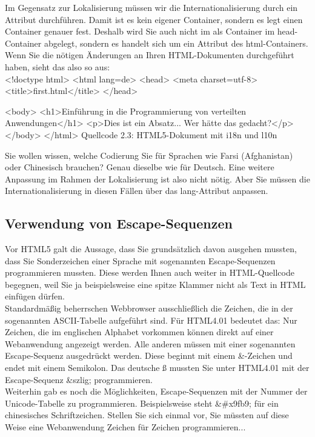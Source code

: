 Im Gegensatz zur Lokalisierung müssen wir die Internationalisierung durch ein Attribut durchführen. Damit ist es kein eigener Container, sondern es legt einen Container genauer fest. Deshalb wird Sie auch nicht im als Container im head-Container abgelegt, sondern es handelt sich um ein Attribut des html-Containers.\\

Wenn Sie die nötigen Änderungen an Ihren HTML-Dokumenten durchgeführt haben, sieht das also so aus:\\

<!doctype html> 
<html lang=de> 
<head> 
<meta charset=utf-8>
<title>first.html</title> 
</head> 

<body> 
<h1>Einführung in die Programmierung von verteilten Anwendungen</h1>
<p>Dies ist ein Absatz... Wer hätte das gedacht?</p> 
</body> 
</html>
Quellcode 2.3: HTML5-Dokument mit i18n und l10n

Sie wollen wissen, welche Codierung Sie für Sprachen wie Farsi (Afghanistan) oder Chinesisch brauchen? Genau dieselbe wie für Deutsch. Eine weitere Anpassung im Rahmen der Lokalisierung ist also nicht nötig. Aber Sie müssen die Internationalisierung in diesen Fällen über das lang-Attribut anpassen.

\subsection{Verwendung von Escape-Sequenzen}

Vor HTML5 galt die Aussage, dass Sie grundsätzlich davon ausgehen mussten, dass Sie Sonderzeichen einer Sprache mit sogenannten Escape-Sequenzen programmieren mussten. Diese werden Ihnen auch weiter in HTML-Quellcode begegnen, weil Sie ja beispielsweise eine spitze Klammer nicht als Text in HTML einfügen dürfen.\\

Standardmäßig beherrschen Webbrowser ausschließlich die Zeichen, die in der sogenannten ASCII-Tabelle aufgeführt sind. Für HTML4.01 bedeutet das: Nur Zeichen, die im englischen Alphabet vorkommen können direkt auf einer Webanwendung angezeigt werden. Alle anderen müssen mit einer sogenannten Escape-Sequenz ausgedrückt werden. Diese beginnt mit einem \&-Zeichen und endet mit einem Semikolon. Das deutsche ß mussten Sie unter HTML4.01 mit der Escape-Sequenz \&szlig; programmieren.\\

Weiterhin gab es noch die Möglichkeiten, Escape-Sequenzen mit der Nummer der Unicode-Tabelle zu programmieren. Beispielsweise steht \&\#x9fb9; für ein chinesisches Schriftzeichen. Stellen Sie sich einmal vor, Sie müssten auf diese Weise eine Webanwendung Zeichen für Zeichen programmieren...\\

